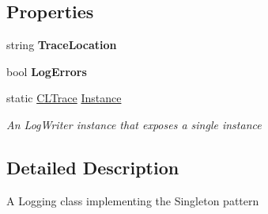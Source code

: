 \subsection*{Properties}
\begin{DoxyCompactItemize}
\item 
\hypertarget{class_cloud_api_public_1_1_support_1_1_c_l_trace_addcbdd62159c831362a9cc3d1f48bae5}{string {\bfseries Trace\-Location}}\label{class_cloud_api_public_1_1_support_1_1_c_l_trace_addcbdd62159c831362a9cc3d1f48bae5}

\item 
\hypertarget{class_cloud_api_public_1_1_support_1_1_c_l_trace_a10a8a85df179fc24c31ed4485e5296a2}{bool {\bfseries Log\-Errors}}\label{class_cloud_api_public_1_1_support_1_1_c_l_trace_a10a8a85df179fc24c31ed4485e5296a2}

\item 
static \hyperlink{class_cloud_api_public_1_1_support_1_1_c_l_trace}{C\-L\-Trace} \hyperlink{class_cloud_api_public_1_1_support_1_1_c_l_trace_a0861d3bda40d01c666acb82cef1cb595}{Instance}
\begin{DoxyCompactList}\small\item\em An Log\-Writer instance that exposes a single instance \end{DoxyCompactList}\end{DoxyCompactItemize}


\subsection{Detailed Description}
A Logging class implementing the Singleton pattern 



